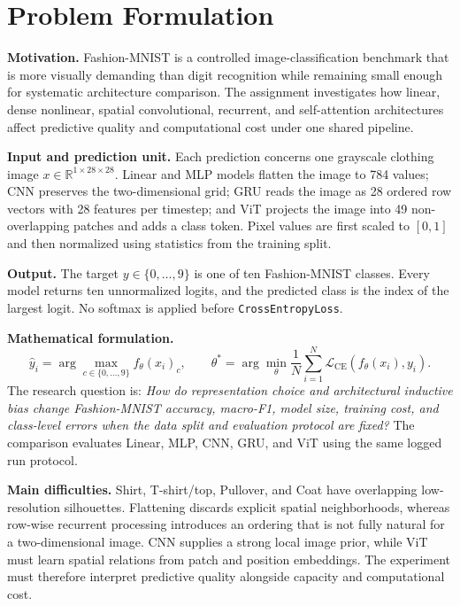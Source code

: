 \section{Problem Formulation}

\textbf{Motivation.} Fashion-MNIST is a controlled image-classification benchmark that is more visually demanding than digit recognition while remaining small enough for systematic architecture comparison. The assignment investigates how linear, dense nonlinear, spatial convolutional, recurrent, and self-attention architectures affect predictive quality and computational cost under one shared pipeline.

\textbf{Input and prediction unit.} Each prediction concerns one grayscale clothing image $x\in\mathbb{R}^{1\times28\times28}$. Linear and MLP models flatten the image to 784 values; CNN preserves the two-dimensional grid; GRU reads the image as 28 ordered row vectors with 28 features per timestep; and ViT projects the image into 49 non-overlapping patches and adds a class token. Pixel values are first scaled to $[0,1]$ and then normalized using statistics from the training split.

\textbf{Output.} The target $y\in\{0,\ldots,9\}$ is one of ten Fashion-MNIST classes. Every model returns ten unnormalized logits, and the predicted class is the index of the largest logit. No softmax is applied before \texttt{CrossEntropyLoss}.

\textbf{Mathematical formulation.}
\begin{equation}
    \hat{y}_i=\arg\max_{c\in\{0,\ldots,9\}} f_{\theta}(x_i)_c,
    \qquad
    \theta^{*}=\arg\min_{\theta}\frac{1}{N}\sum_{i=1}^{N}
    \mathcal{L}_{\mathrm{CE}}\!\left(f_{\theta}(x_i),y_i\right).
    \label{eq:problem-formulation}
\end{equation}
The research question is: \emph{How do representation choice and architectural inductive bias change Fashion-MNIST accuracy, macro-F1, model size, training cost, and class-level errors when the data split and evaluation protocol are fixed?} The comparison evaluates Linear, MLP, CNN, GRU, and ViT using the same logged run protocol.

\textbf{Main difficulties.} Shirt, T-shirt/top, Pullover, and Coat have overlapping low-resolution silhouettes. Flattening discards explicit spatial neighborhoods, whereas row-wise recurrent processing introduces an ordering that is not fully natural for a two-dimensional image. CNN supplies a strong local image prior, while ViT must learn spatial relations from patch and position embeddings. The experiment must therefore interpret predictive quality alongside capacity and computational cost.
